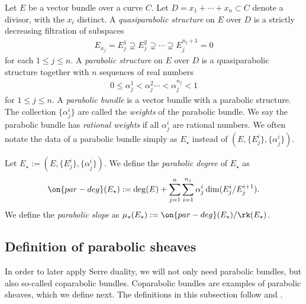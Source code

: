 \begin{definition}
\notready
	\label{definition:parabolic-bundle}
	Let $E$ be a vector bundle over a curve $C$.
	Let $D = x_1 + \cdots + x_n \subset C$ denote a divisor, with the $x_i$ distinct.
	A {\em quasiparabolic structure} on $E$ over $D$ is a strictly decreasing
	filtration of subspaces
	\begin{align*}
		E_{x_j} = E_j^1 \supsetneq E_j^2 \supsetneq \cdots \supsetneq E_j^{n_j+1}
		= 0
	\end{align*}
	for each $1 \leq j \leq n$.
	A {\em parabolic structure} on $E$ over $D$ is a quasiparabolic
	structure together with
	$n$ sequences of real numbers
	\begin{align*}
		0 \leq \alpha^1_j < \alpha^2_j \cdots < \alpha^{n_j}_j < 1
	\end{align*}
	for $1 \leq j \leq n$.
	A {\em parabolic bundle} is a vector bundle with a parabolic structure.
	The collection $\{\alpha^i_j\}$ are called the {\em weights} of the
	parabolic bundle. We say the parabolic bundle has {\em rational weights} if
	all $\alpha^i_j$ are rational numbers.
	We often notate the data of a parabolic bundle simply as $E_\star$
	instead of $(E, \{E^i_j\}, \{\alpha^i_j\})$.
\end{definition}

\begin{definition}
\notready
	\label{definition:}
	Let $E_\star := (E, \{E^i_j\}, \{\alpha^i_j\})$. We define the {\em
	parabolic degree} of $E_\star$ as
\begin{align*}
	\on{par-deg}(E_\star) := \deg(E) + \sum_{j=1}^n \sum_{i=1}^{n_j}
	\alpha^i_j \dim(E_j^i/E_j^{i+1}).
\end{align*}
We define the {\em parabolic slope} as $\mu_\star(E_\star) :=
\on{par-deg}(E_\star)/\rk(E_\star)$.
\end{definition}

\subsection{Definition of parabolic sheaves}
\label{subsubsection:parabolic-sheaf}

In order to later apply Serre duality, we will not only need parabolic bundles, but also so-called
coparabolic bundles. Coparabolic bundles are examples of parabolic sheaves,
which we define next.
The definitions in this subsection follow
\cite{yokogawa:infinitesimal-deformation} and
\cite{bodenY:moduli-spaces-of-parabolic-higgs-bundles}.


